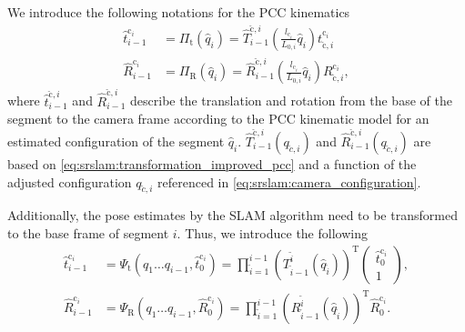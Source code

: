 We introduce the following notations for the \gls{PCC} kinematics
\begin{equation}\label{eq:srslam:Pi}
\begin{split}
    \hat{t}_{i-1}^{\mathrm{c}_i} &= \Pi_\mathrm{t}(\hat{q}_i) = 
    \hat{T}_{i-1}^{\check{\mathrm{c}},i} \left (\frac{l_{\mathrm{c}_i}}{L_{0,i}} \hat{q}_i \right )
    t_{\check{\mathrm{c}},i}^{\mathrm{c}_i}\\
    \hat{R}_{i-1}^{\mathrm{c}_i} &= \Pi_\mathrm{R}(\hat{q}_i) =
    \hat{R}_{i-1}^{\check{\mathrm{c}},i} \left (\frac{l_{\mathrm{c}_i}}{L_{0,i}} \hat{q}_i \right )
    R_{\check{\mathrm{c}},i}^{\mathrm{c}_i},
\end{split}
\end{equation}
where $\hat{t}_{i-1}^{\check{\mathrm{c}},i}$ and $\hat{R}_{i-1}^{\check{\mathrm{c}},i}$ describe the translation and rotation from the base of the segment to the camera frame according to the \gls{PCC} kinematic model for an estimated configuration of the segment $\hat{q}_i$. $\hat{T}_{i-1}^{\check{\mathrm{c}},i}(q_{\check{c},i})$ and $\hat{R}_{i-1}^{\check{\mathrm{c}},i}(q_{\check{c},i})$ are based on \eqref{eq:srslam:transformation_improved_pcc} and a function of the adjusted configuration $q_{\check{c},i}$ referenced in \eqref{eq:srslam:camera_configuration}.

Additionally, the pose estimates by the \gls{SLAM} algorithm need to be transformed to the base frame of segment $i$. Thus, we introduce the following
\begin{equation}\label{eq:srslam:Psi}
\begin{split}
    \hat{t}_{i-1}^{\mathrm{c}_i} &= \Psi_\mathrm{t}(q_1 \dots q_{i-1}, \hat{t}_{0}^{\mathrm{c}_i}) =
    \prod_{\tilde{i}=1}^{i-1} \left ( T_{\tilde{i}-1}^{\tilde{i}} \left (\hat{q}_{\tilde{i}} \right )  \right )^\mathrm{T}
    \begin{pmatrix}
        \hat{t}_{0}^{\mathrm{c}_i}\\
        1
    \end{pmatrix},\\
    \hat{R}_{i-1}^{\mathrm{c}_i} &= \Psi_\mathrm{R}(q_1 \dots q_{i-1}, \hat{R}_{0}^{\mathrm{c}_i}) =
    \prod_{\tilde{i}=1}^{i-1} \left ( R_{\tilde{i}-1}^{\tilde{i}} \left (\hat{q}_{\tilde{i}} \right )  \right )^\mathrm{T}
    \hat{R}_{0}^{\mathrm{c}_i}.
\end{split}    
\end{equation}

